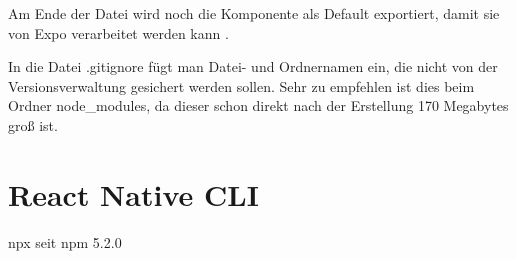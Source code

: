 Am Ende der Datei wird noch die Komponente als Default exportiert, damit sie von Expo verarbeitet
werden kann \cite{jsModules}.

In die Datei .gitignore fügt man Datei- und Ordnernamen ein, die nicht von der Versionsverwaltung
gesichert werden sollen. Sehr zu empfehlen ist dies beim Ordner node\_modules, da dieser schon
direkt nach der Erstellung 170 Megabytes groß ist.

\subsection{}

\section{React Native CLI}
npx seit npm 5.2.0